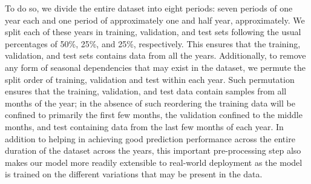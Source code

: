 To do so, we divide the entire dataset into eight periods: seven periods of one year each and one period of approximately one and half year, approximately. We split each of these years in training, validation, and test sets following the usual percentages of 50\%, 25\%, and 25\%, respectively.  This ensures that the training, validation, and test sets contains data from all the years. Additionally, to remove any form of seasonal dependencies that may exist in the dataset, we permute the split order of training, validation and test within each year.  Such permutation ensures that the training, validation, and test data contain samples from all months of the year; in the absence of such reordering the training data will be confined to primarily the first few months, the validation confined to the middle months, and test containing data from the last few months of each year. In addition to helping in achieving good prediction performance across the entire duration of the dataset across the years, this important pre-processing step also makes our model more readily extensible to real-world deployment as the model is trained on the different variations that may be present in the data.




